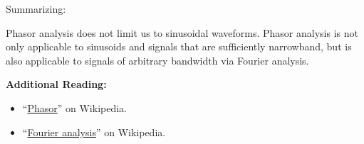 \vfill\break %

Summarizing:
\begin{mdframed}[backgroundcolor=yellow!20,nobreak=true] 
Phasor analysis does not limit us to sinusoidal waveforms. Phasor analysis is not only applicable to sinusoids and signals that are sufficiently narrowband, but is also applicable to signals of arbitrary bandwidth via Fourier analysis.
\end{mdframed}


{\bf Additional Reading:}
\begin{itemize}
\item ``\href{https://en.wikipedia.org/wiki/Phasor}{Phasor}'' on Wikipedia.
\item ``\href{https://en.wikipedia.org/wiki/Fourier_analysis}{Fourier analysis}'' on Wikipedia.
\end{itemize}


